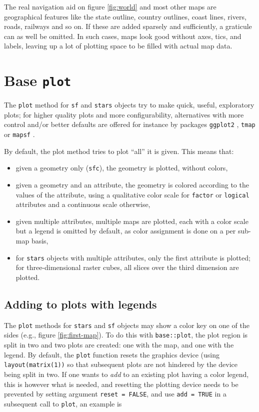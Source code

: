 \documentclass[]{book}
\providecommand{\tightlist}{%
  \setlength{\itemsep}{0pt}\setlength{\parskip}{0pt}}
\begin{document}
The real navigation aid on figure \ref{fig:world} and most other
maps are geographical features like the state outline, country
outlines, coast lines, rivers, roads, railways and so on. If these
are added sparsely and sufficiently, a graticule can as well be
omitted. In such cases, maps look good without axes, tics, and labels,
leaving up a lot of plotting space to be filled with actual map data.

\hypertarget{base-plot}{%
\section{\texorpdfstring{Base \texttt{plot}}{Base plot}}\label{base-plot}}

The \texttt{plot} method for \texttt{sf} and \texttt{stars} objects try to make quick,
useful, exploratory plots; for higher quality plots and more
configurability, alternatives with more control and/or better
defaults are offered for instance by packages \texttt{ggplot2} \citep{R-ggplot2},
\texttt{tmap} \citep{R-tmap, tmap} or \texttt{mapsf} \citep{R-mapsf}.

By default, the plot method tries to plot ``all'' it is given.
This means that:

\begin{itemize}
\tightlist
\item
  given a geometry only (\texttt{sfc}), the geometry is plotted, without colors,
\item
  given a geometry and an attribute, the geometry is colored according to
  the values of the attribute, using a qualitative color scale for \texttt{factor}
  or \texttt{logical} attributes and a continuous scale otherwise,
\item
  given multiple attributes, multiple maps are plotted, each with a color
  scale but a legend is omitted by default, as color assignment is
  done on a per sub-map basis,
\item
  for \texttt{stars} objects with multiple attributes, only the first
  attribute is plotted; for three-dimensional raster cubes, all
  slices over the third dimension are plotted.
\end{itemize}

\hypertarget{adding-to-plots-with-legends}{%
\subsection{Adding to plots with legends}\label{adding-to-plots-with-legends}}

The \texttt{plot} methods for \texttt{stars} and \texttt{sf} objects may show a color key
on one of the sides (e.g., figure \ref{fig:first-map}). To do this
with \texttt{base::plot}, the plot region is split in two and two plots are
created: one with the map, and one with the legend. By default, the
\texttt{plot} function resets the graphics device (using \texttt{layout(matrix(1))}
so that subsequent plots are not hindered by the device being split
in two. If one wants to \emph{add} to an existing plot having a color
legend, this is however what is needed, and resetting the plotting
device needs to be prevented by setting argument \texttt{reset\ =\ FALSE},
and use \texttt{add\ =\ TRUE} in a subsequent call to \texttt{plot}, an example
is
\end{document}
